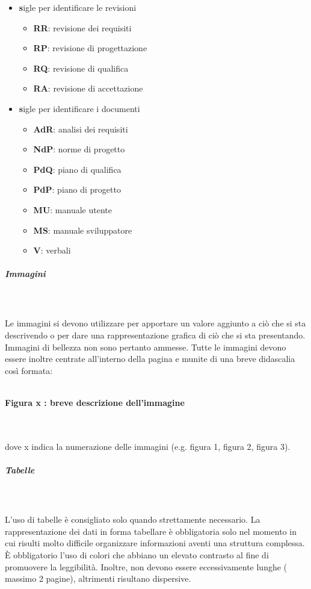 \documentclass[../norme-di-progetto.tex]{subfiles}
\begin{document}
\begin{itemize}
	\item\textbf sigle per identificare le revisioni
	\begin{itemize}
		\item \textbf{RR}: revisione dei requisiti
		\item \textbf{RP}: revisione di progettazione
		\item \textbf{RQ}: revisione di qualifica
		\item \textbf{RA}: revisione di accettazione
	\end{itemize}
	\item\textbf sigle per identificare i documenti
	\begin{itemize}
		\item \textbf{AdR}: analisi dei requisiti
		\item \textbf{NdP}: norme di progetto
		\item \textbf{PdQ}: piano di qualifica
		\item \textbf{PdP}: piano di progetto
		\item \textbf{MU}: manuale utente
		\item \textbf{MS}: manuale sviluppatore
		\item \textbf{V}: verbali
 	\end{itemize}
 \end{itemize}
\subparagraph{Immagini}\mbox{}\\
\label{subp:immagini}
\\Le immagini si devono utilizzare per apportare un valore aggiunto a ciò che si sta descrivendo o per dare una rappresentazione grafica di ciò che si sta presentando. Immagini di bellezza non sono pertanto ammesse. Tutte le immagini devono essere inoltre centrate all'interno della pagina e munite di una breve didascalia così formata: \\\\\centerline{\textbf{Figura x : breve descrizione dell'immagine}} \\\\ dove x indica la numerazione delle immagini (e.g. figura 1, figura 2, figura 3).
\subparagraph{Tabelle}\mbox{}\\
\label{subp:tabelle}
\\L'uso di tabelle è consigliato solo quando strettamente necessario. La rappresentazione dei dati in forma tabellare è obbligatoria solo nel momento in cui risulti molto difficile organizzare informazioni aventi una struttura complessa. È obbligatorio l'uso di colori che abbiano un elevato contrasto al fine di promuovere la leggibilità. Inoltre, non devono essere eccessivamente lunghe ( massimo 2 pagine), altrimenti risultano dispersive.
\end{document}
